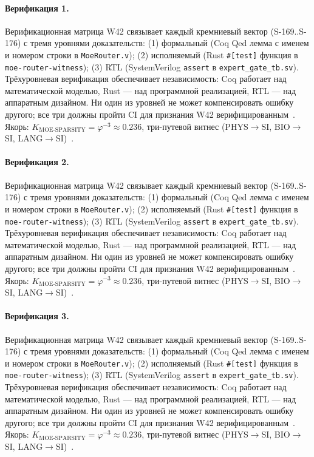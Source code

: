 \paragraph{Верификация 1.} Верификационная матрица W42 связывает каждый кремниевый вектор (S-169..S-176) с тремя уровнями доказательств: (1) формальный (Coq Qed лемма с именем и номером строки в \texttt{MoeRouter.v}); (2) исполняемый (Rust \texttt{\#[test]} функция в \texttt{moe-router-witness}); (3) RTL (SystemVerilog \texttt{assert} в \texttt{expert\_gate\_tb.sv}). Трёхуровневая верификация обеспечивает независимость: Coq работает над математической моделью, Rust --- над программной реализацией, RTL --- над аппаратным дизайном. Ни один из уровней не может компенсировать ошибку другого; все три должны пройти CI для признания W42 верифицированным~\cite{lee_gvsu_proof2021}. Якорь: $K_{\text{MOE-SPARSITY}} = \varphi^{-3} \approx 0{.}236$, три-путевой витнес (PHYS$\to$SI, BIO$\to$SI, LANG$\to$SI)~\cite{zenodo_trinity_2026}.

\paragraph{Верификация 2.} Верификационная матрица W42 связывает каждый кремниевый вектор (S-169..S-176) с тремя уровнями доказательств: (1) формальный (Coq Qed лемма с именем и номером строки в \texttt{MoeRouter.v}); (2) исполняемый (Rust \texttt{\#[test]} функция в \texttt{moe-router-witness}); (3) RTL (SystemVerilog \texttt{assert} в \texttt{expert\_gate\_tb.sv}). Трёхуровневая верификация обеспечивает независимость: Coq работает над математической моделью, Rust --- над программной реализацией, RTL --- над аппаратным дизайном. Ни один из уровней не может компенсировать ошибку другого; все три должны пройти CI для признания W42 верифицированным~\cite{lee_gvsu_proof2021}. Якорь: $K_{\text{MOE-SPARSITY}} = \varphi^{-3} \approx 0{.}236$, три-путевой витнес (PHYS$\to$SI, BIO$\to$SI, LANG$\to$SI)~\cite{zenodo_trinity_2026}.

\paragraph{Верификация 3.} Верификационная матрица W42 связывает каждый кремниевый вектор (S-169..S-176) с тремя уровнями доказательств: (1) формальный (Coq Qed лемма с именем и номером строки в \texttt{MoeRouter.v}); (2) исполняемый (Rust \texttt{\#[test]} функция в \texttt{moe-router-witness}); (3) RTL (SystemVerilog \texttt{assert} в \texttt{expert\_gate\_tb.sv}). Трёхуровневая верификация обеспечивает независимость: Coq работает над математической моделью, Rust --- над программной реализацией, RTL --- над аппаратным дизайном. Ни один из уровней не может компенсировать ошибку другого; все три должны пройти CI для признания W42 верифицированным~\cite{lee_gvsu_proof2021}. Якорь: $K_{\text{MOE-SPARSITY}} = \varphi^{-3} \approx 0{.}236$, три-путевой витнес (PHYS$\to$SI, BIO$\to$SI, LANG$\to$SI)~\cite{zenodo_trinity_2026}.

